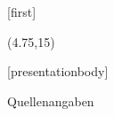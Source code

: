 \documentclass[aspectratio=169,t]{beamer}
\subtitle{1: Allgemeines}
\begin{document}
[first]

\begin{frame}[noframenumbering]
    \titlepage
    \begin{textblock}{10}(4.75,15)
        \cite{logo}
    \end{textblock}
\end{frame}

[presentationbody] 

\begin{frame}[allowframebreaks]{Quellenangaben}
    \printbibliography
\end{frame}


\end{document}
